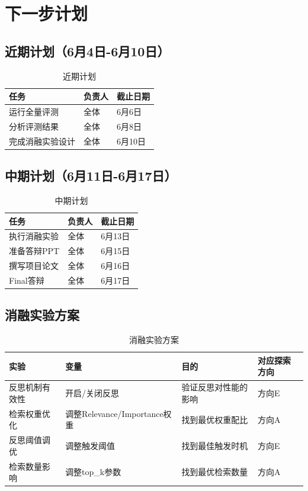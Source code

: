 \documentclass[11pt]{article}
\begin{document}
\section{下一步计划}

\subsection{近期计划（6月4日-6月10日）}

\begin{table}[H]
    \centering
    \begin{tabular}{|l|l|l|}
        \hline
        任务 & 负责人 & 截止日期 \\
        \hline
        运行全量评测 & 全体 & 6月6日 \\
        \hline
        分析评测结果 & 全体 & 6月8日 \\
        \hline
        完成消融实验设计 & 全体 & 6月10日 \\
        \hline
    \end{tabular}
    \caption{近期计划}
\end{table}

\subsection{中期计划（6月11日-6月17日）}

\begin{table}[H]
    \centering
    \begin{tabular}{|l|l|l|}
        \hline
        任务 & 负责人 & 截止日期 \\
        \hline
        执行消融实验 & 全体 & 6月13日 \\
        \hline
        准备答辩PPT & 全体 & 6月15日 \\
        \hline
        撰写项目论文 & 全体 & 6月16日 \\
        \hline
        Final答辩 & 全体 & 6月17日 \\
        \hline
    \end{tabular}
    \caption{中期计划}
\end{table}

\subsection{消融实验方案}

\begin{table}[H]
    \centering
    \begin{tabular}{|l|l|l|l|}
        \hline
        实验 & 变量 & 目的 & 对应探索方向 \\
        \hline
        反思机制有效性 & 开启/关闭反思 & 验证反思对性能的影响 & 方向E \\
        \hline
        检索权重优化 & 调整Relevance/Importance权重 & 找到最优权重配比 & 方向A \\
        \hline
        反思阈值调优 & 调整触发阈值 & 找到最佳触发时机 & 方向E \\
        \hline
        检索数量影响 & 调整top\_k参数 & 找到最优检索数量 & 方向A \\
        \hline
    \end{tabular}
    \caption{消融实验方案}
\end{table}
\end{document}
